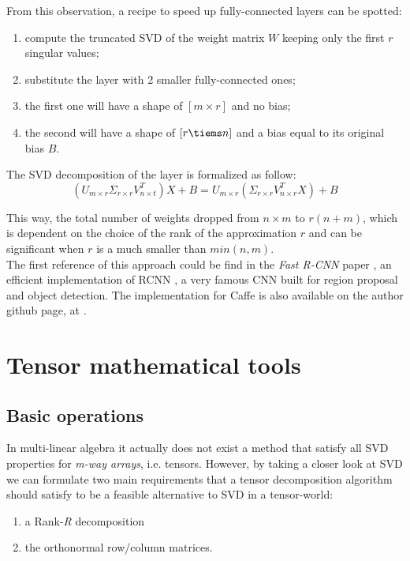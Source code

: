From this observation, a recipe to speed up fully-connected layers can be spotted: 
\begin{enumerate}
	\item compute the truncated SVD of the weight matrix $W$ keeping only the first $\mathit{r}$ singular values; 
	\item substitute the layer with 2 smaller fully-connected ones; 
	\item the first one will have a shape of $[m \times r]$ and no bias; 
	\item the second will have a shape of $[ r \tiems n]$ and a bias equal to its original bias $B$.   
\end{enumerate}

The SVD decomposition of the layer is formalized as follow: 
\begin{equation}
(U_{m \times r} \Sigma_{r \times r} V^T_{n \times t}) X+ B = U_{m \times r} ( \Sigma_{r \times r}V^T_{n \times r} X) + B 
\end{equation}


This way, the total number of weights dropped from $n \times m$ to $r(n+m)$, which is dependent on the choice of the rank of the approximation $r$ and can be significant when $r$ is a much smaller than $min(n, m)$.\\
The first reference of this approach could be find in the \emph{Fast R-CNN} paper , an efficient implementation of RCNN \parencite{rcnn}, a very famous CNN built for region proposal and object detection. The implementation for Caffe is also available on the author github page, at \parencite{Wgithub-rcnn}.
\section{Tensor mathematical tools}
\label{sec:tensor-math}

\subsection{Basic operations}
In multi-linear algebra it actually does not exist a method that satisfy all SVD properties for \emph{m-way arrays}, i.e. tensors. However, by taking a closer look at SVD we can formulate two main requirements that a tensor decomposition algorithm should satisfy to be a feasible alternative to SVD in a tensor-world: 
{\begin{enumerate}
	\item a Rank-\textit{R} decomposition
	\item the orthonormal row/column matrices.
\end{enumerate}}

